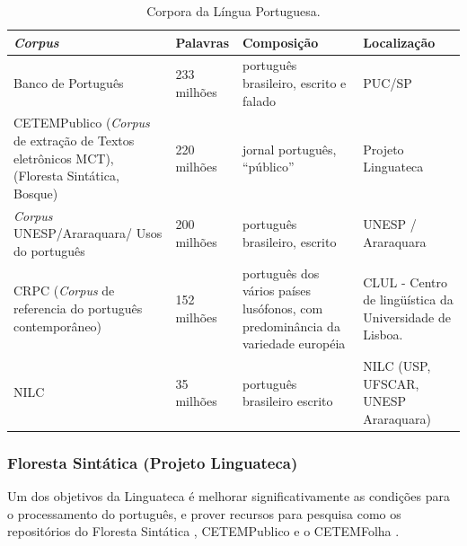 \begin{table}[H]
   \centering
   \small
   \caption{ Corpora da Língua Portuguesa.}

    \begin{tabular}{ | p{5cm} | p{3cm} | p{3cm} | p{3cm} | }
      \hline
        \textbf{\emph{Corpus}} & \textbf{Palavras} & \textbf{Composição}& \textbf{Localização}\\
        \hline
        \hline

        Banco de Português &  233 milhões & português brasileiro, escrito e falado & PUC/SP \\

        \hline

        CETEMPublico (\emph{Corpus} de extração de Textos eletrônicos MCT), (Floresta Sintática, Bosque) & 220 milhões & jornal português, ``público'' & Projeto Linguateca \\

        \hline

        \emph{Corpus} UNESP/Araraquara/ Usos do português & 200 milhões & português brasileiro, escrito & UNESP / Araraquara \\

        \hline

        CRPC (\emph{Corpus} de referencia do português contemporâneo) & 152 milhões & português dos vários países lusófonos, com predominância da variedade européia & CLUL - Centro de lingüística da Universidade de Lisboa. \\

        \hline

        NILC & 35 milhões & português brasileiro escrito & NILC (USP, UFSCAR, UNESP Araraquara) \\
    \hline

   \end{tabular}
   \label{tbl:corpora_port}
\end{table}

\subsubsection{Floresta Sintática (Projeto Linguateca)}
\label{sub:sub_linguateca}

Um dos objetivos da Linguateca é melhorar significativamente as condições para o processamento do português, e prover recursos para pesquisa como os repositórios do Floresta Sintática , CETEMPublico e o CETEMFolha .

